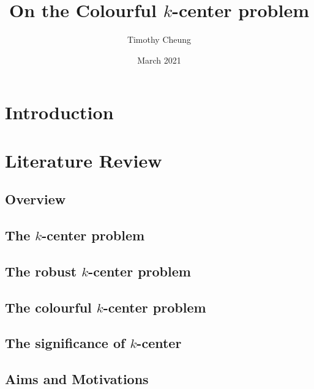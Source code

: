 \documentclass{article}
\title{On the Colourful $k$-center problem}
\author{Timothy Cheung}
\date{March 2021}
\begin{document}
\maketitle
\newpage
\begin{abstract}

\end{abstract}
\newpage

\newpage
\tableofcontents
\newpage
\section{Introduction}


\section{Literature Review}\label{section:lit_review}
    \subsection{Overview}
    
    
    \subsection{The $k$-center problem}\label{section:k_center}
    
    
    \subsection{The robust $k$-center problem}
    
    
    \subsection{The colourful $k$-center problem}
    
    
    \subsection{The significance of $k$-center}
    
    
    \subsection{Aims and Motivations}
    
    
\end{document}
